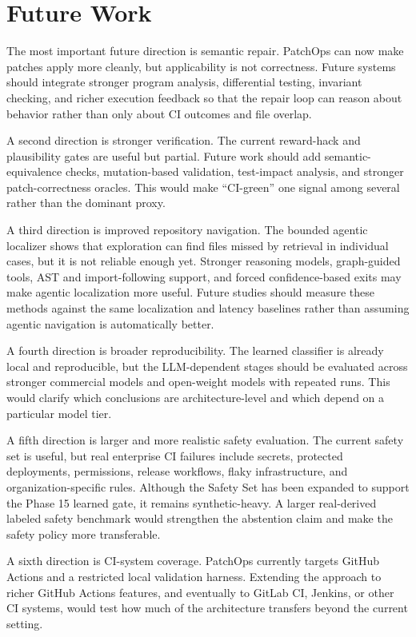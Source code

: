 \section{Future Work}

The most important future direction is semantic repair. PatchOps can now make patches apply more cleanly, but
applicability is not correctness. Future systems should integrate stronger program analysis, differential
testing, invariant checking, and richer execution feedback so that the repair loop can reason about behavior
rather than only about CI outcomes and file overlap.

A second direction is stronger verification. The current reward-hack and plausibility gates are useful but
partial. Future work should add semantic-equivalence checks, mutation-based validation, test-impact analysis,
and stronger patch-correctness oracles. This would make ``CI-green'' one signal among several rather than the
dominant proxy.

A third direction is improved repository navigation. The bounded agentic localizer shows that exploration can
find files missed by retrieval in individual cases, but it is not reliable enough yet. Stronger reasoning
models, graph-guided tools, AST and import-following support, and forced confidence-based exits may make
agentic localization more useful. Future studies should measure these methods against the same localization
and latency baselines rather than assuming agentic navigation is automatically better.

A fourth direction is broader reproducibility. The learned classifier is already local and reproducible, but
the LLM-dependent stages should be evaluated across stronger commercial models and open-weight models with
repeated runs. This would clarify which conclusions are architecture-level and which depend on a particular
model tier.

A fifth direction is larger and more realistic safety evaluation. The current safety set is useful, but real
enterprise CI failures include secrets, protected deployments, permissions, release workflows, flaky
infrastructure, and organization-specific rules. Although the Safety Set has been expanded to support the Phase
15 learned gate, it remains synthetic-heavy. A larger real-derived labeled safety benchmark would strengthen the
abstention claim and make the safety policy more transferable.

A sixth direction is CI-system coverage. PatchOps currently targets GitHub Actions and a restricted local
validation harness. Extending the approach to richer GitHub Actions features, and eventually to GitLab CI,
Jenkins, or other CI systems, would test how much of the architecture transfers beyond the current setting.


